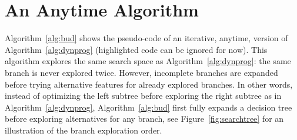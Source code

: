 \documentclass{article}
\begin{document}




\section{An Anytime Algorithm}

Algorithm~\ref{alg:bud} shows the pseudo-code of an iterative, anytime, version of Algorithm~\ref{alg:dynprog} (highlighted code can be ignored for now). This algorithm
explores the same search space as Algorithm~\ref{alg:dynprog}: the same branch is never explored twice. However, incomplete branches are expanded before trying alternative features for already explored branches. In other words, instead of optimizing the left subtree before exploring the right subtree as in Algorithm~\ref{alg:dynprog}, Algorithm~\ref{alg:bud} first fully expands a decision tree before exploring alternatives for any branch, see Figure~\ref{fig:searchtree} for an illustration of the branch exploration order.
\end{document}
